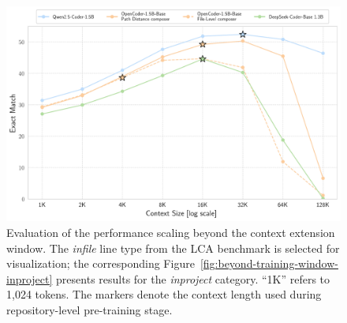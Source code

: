 \begin{figure}[ht]
    \centering
    \includegraphics[width=\textwidth]{figures/beyond-training-window-infile.pdf}
    \caption{Evaluation of the performance scaling beyond the context extension window. The \textit{infile} line type from the LCA benchmark is selected for visualization; the corresponding Figure~\ref{fig:beyond-training-window-inproject} presents results for the \textit{inproject} category. ``1K'' refers to 1,024 tokens. The \raisebox{-0.3ex}{\FiveStarOpen} markers denote the context length used during repository-level pre-training stage.}\label{fig:beyond-training-window-infile}
\end{figure}
